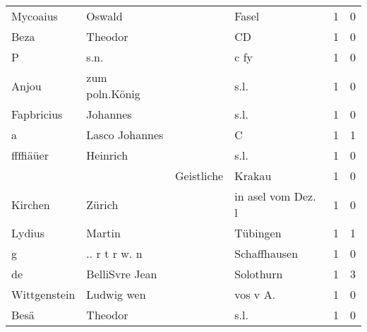 \begin{tabular}{llllrr}
                 Mycoaius &                             Oswald &             &                                       Fasel &          1 &         0 \\
                     Beza &                            Theodor &             &                                          CD &          1 &         0 \\
                        P &                               s.n. &             &                                        c fy &          1 &         0 \\
                    Anjou &                     zum poln.König &             &                                        s.l. &          1 &         0 \\
               Fapbricius &                           Johannes &             &                                        s.l. &          1 &         0 \\
                        a &                     Lasco Johannes &             &                                           C &          1 &         1 \\
                ffffiäüer &                           Heinrich &             &                                        s.l. &          1 &         0 \\
                          &                                    &  Geistliche &                                      Krakau &          1 &         0 \\
                  Kirchen &                             Zürich &             &                          in asel vom Dez. l &          1 &         0 \\
                   Lydius &                             Martin &             &                                    Tübingen &          1 &         1 \\
                        g &                      .. r t r w. n &             &                                Schaffhausen &          1 &         0 \\
                       de &                     BelliSvre Jean &             &                                   Solothurn &          1 &         3 \\
             Wittgenstein &                         Ludwig wen &             &                                   vos v A.  &          1 &         0 \\
                     Besä &                            Theodor &             &                                        s.l. &          1 &         0 \\

\end{tabular}
